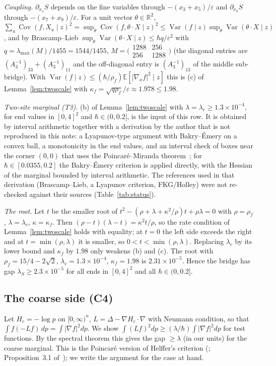 \documentclass[11pt,a4paper]{article}
\theoremstyle{definition}
\theoremstyle{remark}
\newcommand{\E}{\mathbb{E}}
\DeclareMathOperator{\Cov}{Cov}
\DeclareMathOperator{\Var}{Var}
\begin{document}
\emph{Coupling.} $\partial_{x_4}S$ depends on the fine variables through $-(x_3+x_5)/\varepsilon$ and $\partial_{x_8}S$ through $-(x_7+x_9)/\varepsilon$. For a unit vector $\theta\in\mathbb R^2$, $\sum_u\Cov(f,X_u\mid z)^2=\sup_\theta\Cov(f,\theta\cdot X\mid z)^2\le\Var(f\mid z)\sup_\theta\Var(\theta\cdot X\mid z)$, and by Brascamp--Lieb $\sup_\theta\Var(\theta\cdot X\mid z)\le\hbar q/\varepsilon^2$ with $q=\lambda_{\max}(M)/1455=1544/1455$, $M=\bigl(\begin{smallmatrix}1288&256\\256&1288\end{smallmatrix}\bigr)$ (the diagonal entries are $(A_3^{-1})_{33}+(A_3^{-1})_{11}$ and the off-diagonal entry is $(A_3^{-1})_{13}$ of the middle sub-bridge). With $\Var(f\mid z)\le(\hbar/\rho_f)\E[|\nabla_xf|^2\mid z]$ this is (c) of Lemma~\ref{lem:twoscale} with $\kappa_f=\sqrt{q\rho_f}/\varepsilon\approx1.978\le1.98$.

\emph{Two-site marginal (T3).} (b) of Lemma~\ref{lem:twoscale} with $\lambda=\lambda_c\ge1.3\times10^{-4}$, for end values in $[0,4]^2$ and $\hbar\in(0,0.2]$, is the input of this row. It is obtained by interval arithmetic together with a derivation by the author that is not reproduced in this note: a Lyapunov-type argument with Bakry--Émery on a convex ball, a monotonicity in the end values, and an interval check of boxes near the corner $(0,0)$ that uses the Poincaré--Miranda theorem~\cite{Ku}; for $\hbar\in[0.0355,0.2]$ the Bakry--Émery criterion is applied directly, with the Hessian of the marginal bounded by interval arithmetic. The references used in that derivation (Brascamp--Lieb, a Lyapunov criterion, FKG/Holley) were not re-checked against their sources (Table~\ref{tab:status}).

\emph{The root.} Let $t$ be the smaller root of $t^2-(\rho+\lambda+\kappa^2/\rho)t+\rho\lambda=0$ with $\rho=\rho_f$, $\lambda=\lambda_c$, $\kappa=\kappa_f$. Then $(\rho-t)(\lambda-t)=\kappa^2t/\rho$, so the rate condition of Lemma~\ref{lem:twoscale} holds with equality; at $t=0$ the left side exceeds the right and at $t=\min(\rho,\lambda)$ it is smaller, so $0<t<\min(\rho,\lambda)$. Replacing $\lambda_c$ by its lower bound and $\kappa_f$ by $1.98$ only weakens (b) and (c). The root with $\rho_f=15/4-2\sqrt2$, $\lambda_c=1.3\times10^{-4}$, $\kappa_f=1.98$ is $2.31\times10^{-5}$. Hence the bridge has gap $\lambda_S\ge2.3\times10^{-5}$ for all ends in $[0,4]^2$ and all $\hbar\in(0,0.2]$.

\subsection{The coarse side (C4)}\label{app:coarse}
Let $H_c=-\log p$ on $[0,\infty)^n$, $L=\Delta-\nabla H_c\cdot\nabla$ with Neumann condition, so that $\int f(-Lf)\,dp=\int|\nabla f|^2dp$. We show $\int(Lf)^2dp\ge(\lambda/\hbar)\int|\nabla f|^2dp$ for test functions. By the spectral theorem this gives the gap $\ge\lambda$ (in our units) for the coarse marginal. This is the Poincaré version of Helffer's criterion (\cite{He}; Proposition~3.1 of~\cite{Le}); we write the argument for the case at hand.
\end{document}
